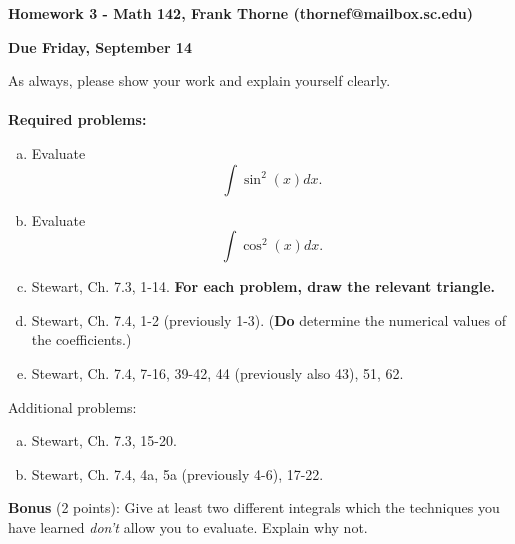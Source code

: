 \documentclass[12pt]{article}
\begin{document}
\setlength{\topmargin}{-2mm}





\begin{center}{\bf Homework 3 - Math 142, Frank Thorne (thornef@mailbox.sc.edu)}
\end{center}
\begin{center}
{\bf Due Friday, September 14}
\end{center}

As always, please show your work and explain yourself clearly. 
\\
\\
{\bf Required problems:}
\begin{enumerate}[(a)]
\item
Evaluate
$$\int \sin^2(x) dx.$$
\item
Evaluate
$$\int \cos^2(x) dx.$$

\item
Stewart, Ch. 7.3, 1-14. {\bf For each problem, draw the relevant triangle.}

\item
Stewart, Ch. 7.4, 1-2 (previously 1-3). ({\bf Do} determine the numerical values of the coefficients.)

\item
Stewart, Ch. 7.4, 7-16, 39-42, 44 (previously also 43), 51, 62.

\end{enumerate}
Additional problems:

\begin{enumerate}[(a)]
\item
Stewart, Ch. 7.3, 15-20.
\item
Stewart, Ch. 7.4, 4a, 5a (previously 4-6), 17-22.
\end{enumerate}
{\bf Bonus} (2 points):
Give at least two different integrals which the techniques you have learned {\itshape don't}
allow you to evaluate. Explain why not.
\end{document}
